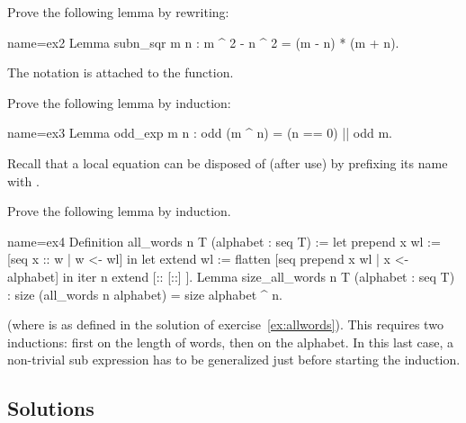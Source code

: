 \begin{Exercise}[label=ex:rewrite,difficulty=0,title={Rewriting}]

Prove the following lemma by rewriting:

\begin{coq}{name=ex2}{}
Lemma subn_sqr m n : m ^ 2 - n ^ 2 = (m - n) * (m + n).
\end{coq}
The \C{(_ ^ _)} notation is attached to the  function.

\end{Exercise}

\begin{Exercise}[label=ex:induction,difficulty=1,title={Induction}]

Prove the following lemma by induction:

\begin{coq}{name=ex3}{}
Lemma odd_exp m n : odd (m ^ n) = (n == 0) || odd m.
\end{coq}
Recall that a local equation can be disposed of (after use)
by prefixing its name with \C{\{\}}.

\end{Exercise}


\begin{Exercise}[label=ex:induction2,difficulty=2,title={Multiple induction}]

Prove the following lemma by induction.

\begin{coq}{name=ex4}{}
Definition all_words n T (alphabet : seq T) :=
  let prepend x wl := [seq x :: w | w <- wl] in
  let extend wl := flatten [seq prepend x wl | x <- alphabet] in
  iter n extend [:: [::] ].
Lemma size_all_words n T (alphabet : seq T) :
  size (all_words n alphabet) = size alphabet ^ n.
\end{coq}

(where  is as defined in the solution of
exercise~\ref{ex:allwords}).
This requires two inductions: first on the length of words,
then on the alphabet.  In this last case, a non-trivial
sub expression has to be generalized just before starting
the induction.

\end{Exercise}

\subsection{Solutions}

